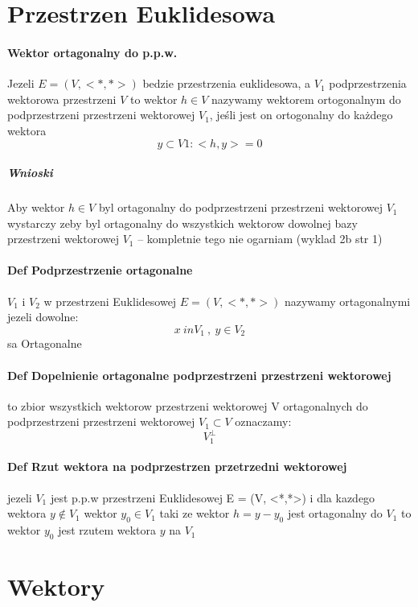 \documentclass[a4paper]{article}
\begin{document}
\section{Przestrzen Euklidesowa}
\paragraph{Wektor ortagonalny do p.p.w.}
Jezeli $ E = (V, <*,*>) $ bedzie przestrzenia euklidesowa, a $ V_{1}$
podprzestrzenia wektorowa przestrzeni $V$ to wektor $h \in V$ nazywamy wektorem ortogonalnym do podprzestrzeni przestrzeni wektorowej $V_1$, jeśli jest on ortogonalny do każdego wektora
\begin{equation}
    y \subset V1: <h, y> = 0
\end{equation}
\subparagraph{Wnioski}
Aby wektor $h\in V$ byl ortagonalny do podprzestrzeni przestrzeni wektorowej $V_1$ wystarczy zeby byl ortagonalny do wszystkich  wektorow dowolnej bazy przestrzeni wektorowej $V_1$ -- kompletnie tego nie ogarniam (wyklad 2b str 1)

\paragraph{Def Podprzestrzenie ortagonalne} $V_1$ i $V_2$ w przestrzeni Euklidesowej $E = (V,<*,*>)$ nazywamy ortagonalnymi jezeli dowolne:
\begin{equation}
    x \ in V_1 \ , \ y \in V_2
\end{equation}
sa Ortagonalne
\paragraph{Def Dopelnienie ortagonalne podprzestrzeni przestrzeni wektorowej}
to zbior wszystkich wektorow przestrzeni wektorowej V ortagonalnych do podprzestrzeni przestrzeni wektorowej $V_1 \subset V $ oznaczamy:
\begin{equation}
    V_1^{\perp}
\end{equation}
\paragraph{Def Rzut wektora na podprzestrzen przetrzedni wektorowej}
jezeli $V_1$ jest p.p.w przestrzeni Euklidesowej E = (V, <*,*>) i dla kazdego wektora $y \notin V_1$ wektor $y_0 \in V_1$ taki ze wektor $h = y - y_0$ jest ortagonalny do $V_1$ to wektor $y_0$ jest rzutem wektora $y$ na $V_1$
\clearpage
\section{Wektory}
\end{document}
